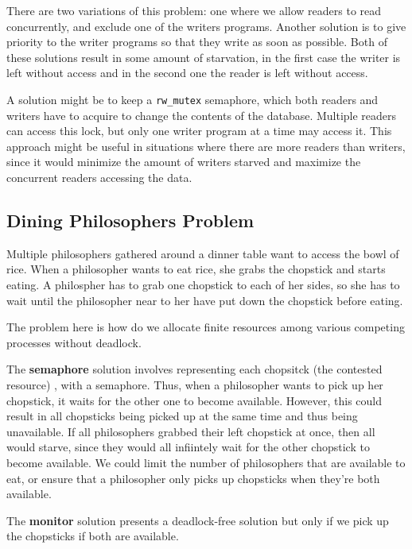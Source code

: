 \documentclass{tufte-handout}
\begin{document}
There are two variations of this problem: one where we allow readers to read 
concurrently, and exclude one of the writers programs. Another solution is to give
priority to the writer programs so that they write as soon as possible. Both of these
solutions result in some amount of starvation, in the first case the writer is left
without access and in the second one the reader is left without access.

A solution might be to keep a \texttt{rw_mutex} semaphore, which both readers and 
writers have to acquire to change the contents of the database. Multiple readers can
access this lock, but only one writer program at a time may access it. This approach might
be useful in situations where there are more readers than writers, since it would minimize
the amount of writers starved and maximize the concurrent readers accessing the data.

\subsection{Dining Philosophers Problem}
Multiple philosophers gathered around a dinner table want to access the bowl of rice.
When a philosopher wants to eat rice, she grabs the chopstick and starts eating. 
A philospher has to grab one chopstick to each of her sides, so she has to wait until
the philosopher near to her have put down the chopstick before eating. 

The problem here is how do we allocate finite resources among various competing processes
without deadlock.

The \textbf{semaphore} solution involves representing each chopsitck (the contested resource)
, with a semaphore. Thus, when a philosopher wants to pick up her chopstick, it waits
for the other one to become available. However, this could result in all chopsticks being
picked up at the same time and thus being unavailable. If all philosophers grabbed their
left chopstick at once, then all would starve, since they would all infiintely wait
for the other chopstick to become available. We could limit the number of philosophers
that are available to eat, or ensure that a philosopher only picks up chopsticks
when they're both available.

The \textbf{monitor} solution presents a deadlock-free solution but only if we pick 
up the chopsticks if both are available.
\end{document}
